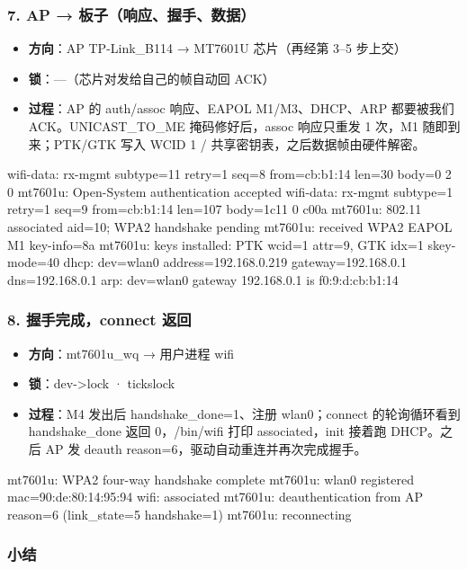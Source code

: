 \documentclass[UTF8,zihao=-4,fontset=none]{ctexart}
\begin{document}
\subsubsection*{7. AP → 板子（响应、握手、数据）}
\begin{itemize}[leftmargin=2em,itemsep=1pt]
\item \textbf{方向}：AP TP-Link\_B114 → MT7601U 芯片（再经第 3–5 步上交）
\item \textbf{锁}：—（芯片对发给自己的帧自动回 ACK）
\item \textbf{过程}：AP 的 auth/assoc 响应、EAPOL M1/M3、DHCP、ARP 都要被我们 ACK。UNICAST\_TO\_ME 掩码修好后，assoc 响应只重发 1 次，M1 随即到来；PTK/GTK 写入 WCID 1 / 共享密钥表，之后数据帧由硬件解密。
\end{itemize}
\begin{logv}
wifi-data: rx-mgmt subtype=11 retry=1 seq=8 from=cb:b1:14 len=30 body=0 2 0
mt7601u: Open-System authentication accepted
wifi-data: rx-mgmt subtype=1 retry=1 seq=9 from=cb:b1:14 len=107 body=1c11 0 c00a
mt7601u: 802.11 associated aid=10; WPA2 handshake pending
mt7601u: received WPA2 EAPOL M1 key-info=8a
mt7601u: keys installed: PTK wcid=1 attr=9, GTK idx=1 skey-mode=40
dhcp: dev=wlan0 address=192.168.0.219 gateway=192.168.0.1 dns=192.168.0.1
arp: dev=wlan0 gateway 192.168.0.1 is f0:9:d:cb:b1:14
\end{logv}

\subsubsection*{8. 握手完成，connect 返回}
\begin{itemize}[leftmargin=2em,itemsep=1pt]
\item \textbf{方向}：mt7601u\_wq → 用户进程 wifi
\item \textbf{锁}：dev->lock · tickslock
\item \textbf{过程}：M4 发出后 handshake\_done=1、注册 wlan0；connect 的轮询循环看到 handshake\_done 返回 0，/bin/wifi 打印 associated，init 接着跑 DHCP。之后 AP 发 deauth reason=6，驱动自动重连并再次完成握手。
\end{itemize}
\begin{logv}
mt7601u: WPA2 four-way handshake complete
mt7601u: wlan0 registered mac=90:de:80:14:95:94
wifi: associated
mt7601u: deauthentication from AP reason=6 (link_state=5 handshake=1)
mt7601u: reconnecting
\end{logv}

\subsubsection*{小结}
\end{document}
